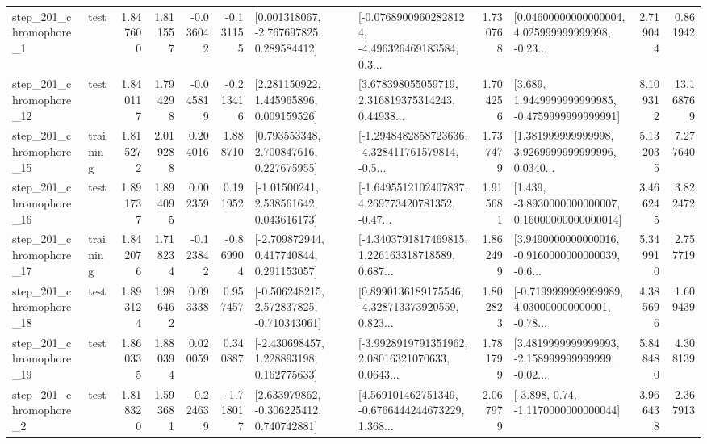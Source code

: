 \begin{tabular}{llrrrrllrlrr}
   step\_201\_chromophore\_1 &      test &      1.847600 &    1.811557 &     -0.036042 & -0.131155 &    [0.001318067, -2.767697825, 0.289584412] &  [-0.07689009602828124, -4.496326469183584, 0.3... &       1.730768 &  [0.04600000000000004, 4.025999999999998, -0.23... &            2.719044 &          0.861942 \\
  step\_201\_chromophore\_12 &      test &      1.840117 &    1.794298 &     -0.045819 & -0.213416 &     [2.281150922, 1.445965896, 0.009159526] &  [3.678398055059719, 2.316819375314243, 0.44938... &       1.704256 &   [3.689, 1.9449999999999985, -0.4759999999999991] &            8.109312 &         13.168769 \\
  step\_201\_chromophore\_15 &  training &      1.815272 &    2.019288 &      0.204016 &  1.888710 &     [0.793553348, 2.700847616, 0.227675955] &  [-1.2948482858723636, -4.328411761579814, -0.5... &       1.737479 &  [1.381999999999998, 3.9269999999999996, 0.0340... &            5.132035 &          7.277640 \\
  step\_201\_chromophore\_16 &      test &      1.891737 &    1.894095 &      0.002359 &  0.191952 &     [-1.01500241, 2.538561642, 0.043616173] &  [-1.6495512102407837, 4.269773420781352, -0.47... &       1.915681 &  [1.439, -3.8930000000000007, 0.16000000000000014] &            3.466245 &          3.822472 \\
  step\_201\_chromophore\_17 &  training &      1.842076 &    1.718234 &     -0.123842 & -0.869904 &    [-2.709872944, 0.417740844, 0.291153057] &  [-4.3403791817469815, 1.226163318718589, 0.687... &       1.862499 &  [3.9490000000000016, -0.9160000000000039, -0.6... &            5.349910 &          2.757719 \\
  step\_201\_chromophore\_18 &      test &      1.893124 &    1.986462 &      0.093338 &  0.957457 &   [-0.506248215, 2.572837825, -0.710343061] &  [0.8990136189175546, -4.328713373920559, 0.823... &       1.802823 &  [-0.7199999999999989, 4.030000000000001, -0.78... &            4.385696 &          1.609439 \\
  step\_201\_chromophore\_19 &      test &      1.860335 &    1.880394 &      0.020059 &  0.340887 &    [-2.430698457, 1.228893198, 0.162775633] &  [-3.9928919791351962, 2.08016321070633, 0.0643... &       1.781799 &  [3.4819999999999993, -2.158999999999999, -0.02... &            5.848480 &          4.308139 \\
   step\_201\_chromophore\_2 &      test &      1.818320 &    1.593681 &     -0.224639 & -1.718017 &    [2.633979862, -0.306225412, 0.740742881] &  [4.569101462751349, -0.6766444244673229, 1.368... &       2.067979 &                [-3.898, 0.74, -1.1170000000000044] &            3.966438 &          2.367913 \\

\end{tabular}
